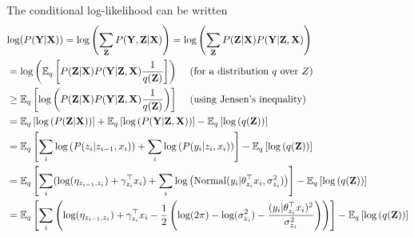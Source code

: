 \documentclass[12pt]{article}
\begin{document}
The conditional log-likelihood can be written
\begin{equation*}
    \begin{split}
        &\text{log}(P(\textbf{Y} | \textbf{X})) = \text{log} \left( \sum_{\textbf{Z}} P(\textbf{Y},\textbf{Z} | \textbf{X}) \right)
             = \text{log} \left( \sum_{\textbf{Z}} P(\textbf{Z} | \textbf{X}) P(\textbf{Y} | \textbf{Z}, \textbf{X}) \right)\\
        & =  \text{log} \left( \mathbb{E}_q \left[ P(\textbf{Z} | \textbf{X}) P(\textbf{Y} | \textbf{Z}, \textbf{X}) \frac{1}{q(\textbf{Z})} \right] \right)
             \text{ \hspace{3mm}(for a distribution $q$ over $Z$)}\\
        & \geq  \mathbb{E}_q \left[  \text{log} \left( P(\textbf{Z} | \textbf{X}) P(\textbf{Y} | \textbf{Z}, \textbf{X}) 
            \frac{1}{q(\textbf{Z})} \right) \right]
             \text{ \hspace{3mm}(using Jensen's inequality)}\\
        & = \mathbb{E}_q \left[ \text{log} \left( P(\textbf{Z} | \textbf{X}) \right) \right] 
             + \mathbb{E}_q \left[\text{log} \left( P(\textbf{Y} | \textbf{Z}, \textbf{X}) \right) \right] 
             - \mathbb{E}_q \left[\text{log} \left( q(\textbf{Z}) \right) \right] \\
        & = \mathbb{E}_q \left[ \sum_i \text{log} \left( P(z_i | z_{i-1}, x_i) \right)
             + \sum_i \text{log} \left( P(y_i | z_i, x_i) \right) \right] 
             - \mathbb{E}_q \left[\text{log} \left( q(\textbf{Z}) \right) \right] \\
        & = \mathbb{E}_q \left[ \sum_i (\text{log}(\eta_{z_{i-1},z_i}) + \gamma_{z_i}^{\top} x_i )
             + \sum_i \text{log} \left( \text{Normal}(y_i | \theta_{z_i}^{\top} x_i, \sigma_{z_i}^2) \right) \right] 
             - \mathbb{E}_q \left[\text{log} \left( q(\textbf{Z}) \right) \right] \\
        & = \mathbb{E}_q \left[ \sum_i \left( \text{log}(\eta_{z_{i-1},z_i}) + \gamma_{z_i}^{\top} x_i 
             -\frac{1}{2}\left( \text{log}(2\pi) - \text{log}(\sigma_{z_i}^2) - \frac{(y_i | \theta_{z_i}^{\top} x_i)^2}{ \sigma_{z_i}^2} \right)  \right) \right]
             - \mathbb{E}_q \left[\text{log} \left( q(\textbf{Z}) \right) \right] \\

\end{split}
\end{equation*}
\end{document}
